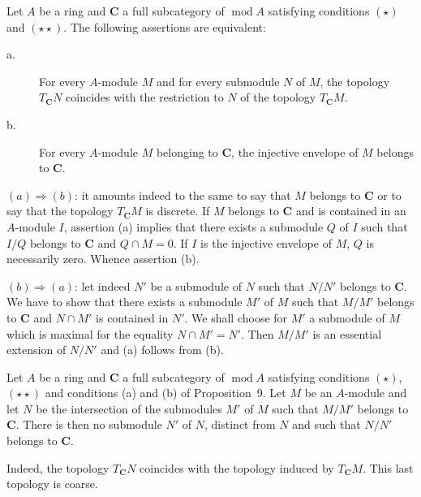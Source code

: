 \begin{proposition}
Let $A$ be a ring and $\mathbf{C}$ a full subcategory of
$\operatorname{mod} A$ satisfying conditions $(\star)$ and
$(\star\star)$. The following assertions are equivalent:
\begin{description}
\item[\normalfont a.] For every $A$-module $M$ and for every submodule
  $N$ of $M$, the topology $T_{\mathbf{C}}N$ coincides with the
  restriction to $N$ of the topology $T_{\mathbf{C}}M$.
\item[\normalfont b.] For every $A$-module $M$ belonging to
  $\mathbf{C}$, the injective envelope of $M$ belongs to $\mathbf{C}$.
\end{description}
\end{proposition}

$(a)\Rightarrow(b)$: it amounts indeed to the same to say that $M$
belongs to $\mathbf{C}$ or to say that the topology $T_{\mathbf{C}}M$ is
discrete. If $M$ belongs to $\mathbf{C}$ and is contained in an
$A$-module $I$, assertion (a) implies that there exists a submodule $Q$
of $I$ such that $I/Q$ belongs to $\mathbf{C}$ and $Q \cap M = 0$. If $I$
is the injective envelope of $M$, $Q$ is necessarily zero. Whence
assertion (b).

$(b)\Rightarrow(a)$: let indeed $N'$ be a submodule of $N$ such that
$N/N'$ belongs to $\mathbf{C}$. We have to show that there exists a
submodule $M'$ of $M$ such that $M/M'$ belongs to $\mathbf{C}$ and
$N \cap M'$ is contained in $N'$. We shall choose for $M'$ a submodule
of $M$ which is maximal for the equality $N \cap M' = N'$. Then $M/M'$
is an essential extension of $N/N'$ and (a) follows from (b).

\begin{corollary}
Let $A$ be a ring and $\mathbf{C}$ a full subcategory of
$\operatorname{mod} A$ satisfying conditions $(\star)$, $(\star\star)$
and conditions (a) and (b) of Proposition~9. Let $M$ be an $A$-module
and let $N$ be the intersection of the submodules $M'$ of $M$ such that
$M/M'$ belongs to $\mathbf{C}$. There is then no submodule $N'$ of $N$,
distinct from $N$ and such that $N/N'$ belongs to $\mathbf{C}$.
\end{corollary}

Indeed, the topology $T_{\mathbf{C}}N$ coincides with the topology
induced by $T_{\mathbf{C}}M$. This last topology is coarse.

